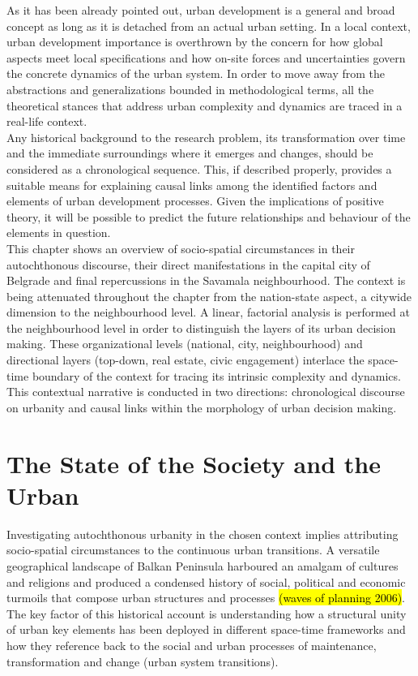 \documentclass[11pt]{report}
\begin{document}
As it has been already pointed out, urban development is a general and broad concept as long as it is detached from an actual urban setting. In a local context, urban development importance is overthrown by the concern for how global aspects meet local specifications and how on-site forces and uncertainties govern the concrete dynamics of the urban system. In order to move away from the abstractions and generalizations bounded in methodological terms, all the theoretical stances that address urban complexity and dynamics are traced in a real-life context.
\\
Any historical background to the research problem, its transformation over time and the immediate surroundings where it emerges and changes, should be considered as a chronological sequence. This, if described properly, provides a suitable means for explaining causal links among the identified factors and elements of urban development processes. Given the implications of positive theory, it will be possible to predict the future relationships and behaviour of the elements in question.
\\
This chapter shows an overview of socio-spatial circumstances in their autochthonous discourse, their direct manifestations in the capital city of Belgrade and final repercussions in the Savamala neighbourhood. The context is being attenuated throughout the chapter from the nation-state aspect, a citywide dimension to the neighbourhood level. A linear, factorial analysis is performed at the neighbourhood level in order to distinguish the layers of its urban decision making.
These organizational levels (national, city, neighbourhood) and directional layers (top-down, real estate, civic engagement) interlace the space-time boundary of the context for tracing its intrinsic complexity and dynamics.
This contextual narrative is conducted in two directions: chronological discourse on urbanity and causal links within the morphology of urban decision making. 

\section{The State of the Society and the Urban}


Investigating autochthonous urbanity in the chosen context implies attributing socio-spatial circumstances to the continuous urban transitions. A versatile geographical landscape of Balkan Peninsula harboured an amalgam of cultures and religions and produced a condensed history of social, political and economic turmoils that compose urban structures and processes \hl{(waves of planning 2006)}.
The key factor of this historical account is understanding how a structural unity of urban key elements has been deployed in different space-time frameworks and how they reference back to the social and urban processes of maintenance, transformation and change (urban system transitions).
\end{document}
